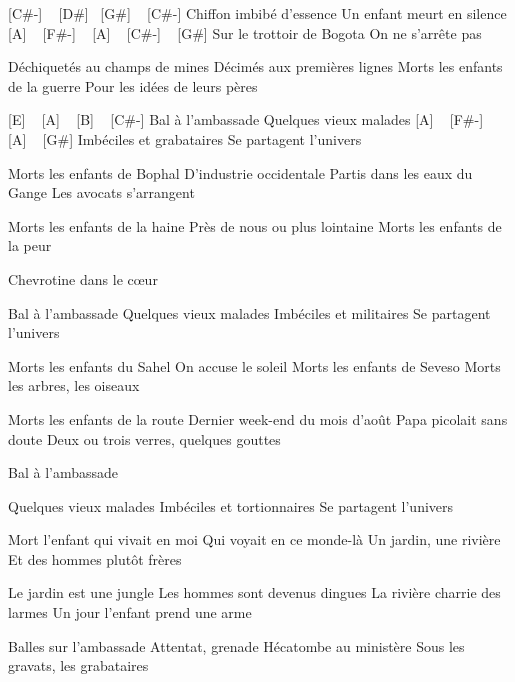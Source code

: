 [C#-] ~ [D#] ~[G#] ~ [C#-]
Chiffon imbibé d'essence
Un enfant meurt en silence
[A] ~ [F#-] ~ [A] ~ [C#-] ~ [G#]
Sur le trottoir de Bogota
On ne s'arrête pas


Déchiquetés au champs de mines
Décimés aux premières lignes
Morts les enfants de la guerre
Pour les idées de leurs pères

[E] ~ [A] ~ [B] ~ [C#-]
Bal à l'ambassade
Quelques vieux malades
[A] ~ [F#-] ~ [A] ~ [G#]
Imbéciles et grabataires
Se partagent l'univers

Morts les enfants de Bophal
D'industrie occidentale
Partis dans les eaux du Gange
Les avocats s'arrangent

Morts les enfants de la haine
Près de nous ou plus lointaine
Morts les enfants de la peur

Chevrotine dans le cœur

Bal à l'ambassade
Quelques vieux malades
Imbéciles et militaires
Se partagent l'univers

Morts les enfants du Sahel
On accuse le soleil
Morts les enfants de Seveso
Morts les arbres, les oiseaux

Morts les enfants de la route
Dernier week-end du mois d'août
Papa picolait sans doute
Deux ou trois verres, quelques gouttes

Bal à l'ambassade

Quelques vieux malades
Imbéciles et tortionnaires
Se partagent l'univers

Mort l'enfant qui vivait en moi
Qui voyait en ce monde-là
Un jardin, une rivière
Et des hommes plutôt frères

Le jardin est une jungle
Les hommes sont devenus dingues
La rivière charrie des larmes
Un jour l'enfant prend une arme

Balles sur l'ambassade
Attentat, grenade
Hécatombe au ministère
Sous les gravats, les grabataires

